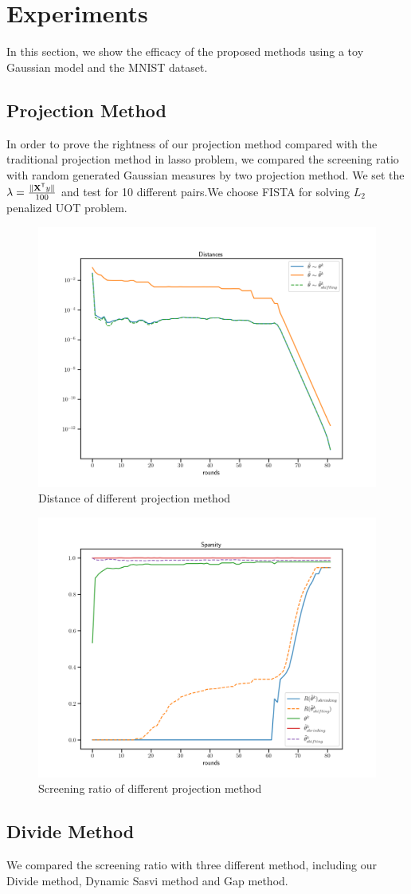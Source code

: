 \section{Experiments}
In this section, we show the efficacy of the proposed methods using a toy Gaussian model and the MNIST dataset.
\subsection{Projection Method}
In order to prove the rightness of our projection method compared with the traditional projection method in lasso problem, we compared the screening ratio with random generated Gaussian measures by two projection method. We set the $\lambda = \frac{\|\mathbf{X}^{\mathsf T}y\|}{100}$ and test for 10 different pairs.We choose FISTA for solving $L_2$ penalized UOT problem. 
	\begin{figure}[htbp]
	\begin{center}	
	\includegraphics[width=0.4\hsize]{pic/projdis}
	\caption{Distance of different projection method}
	\end{center}	
	\end{figure}
	\begin{figure}[htbp]
	\begin{center}	
	\includegraphics[width=0.4\hsize]{pic/sparse_proj}
	\caption{Screening ratio of different projection method}
	\end{center}	
	\end{figure}

\subsection{Divide Method}
We compared the screening ratio with three different method, including our Divide method, Dynamic Sasvi method and Gap method. 

